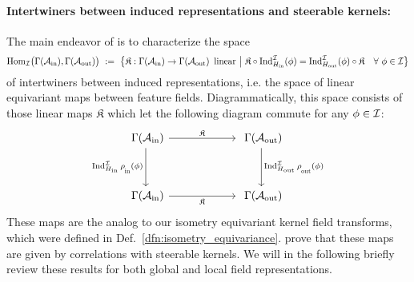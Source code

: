 \paragraph{Intertwiners between induced representations and steerable kernels:}
The main endeavor of \citet{Cohen2018-intertwiners}\cite{Cohen2019-generaltheory} is to characterize the space
\begin{align}
    \Hom_{\I}\! \big( \Gamma(\Ain), \Gamma(\Aout) \big)
    \ :=\ \big\{ \mathfrak{K}: \Gamma(\Ain) \to \Gamma(\Aout)\,\ \textup{linear} \ \big|\ 
        \mathfrak{K}\circ \Ind_{\Hin}^{\I}(\phi) = \Ind_{\Hout}^{\I}(\phi) \circ\mathfrak{K}\ \ \ \forall\ \phi\in\I \big\}
\end{align}
of intertwiners between induced representations, i.e. the space of linear equivariant maps between feature fields.
Diagrammatically, this space consists of those linear maps $\mathfrak{K}$ which let the following diagram commute for any $\phi\in\mathcal{I}$:
\begin{equation}
\begin{tikzcd}[column sep=60pt, row sep=35, font=\normalsize]
    \Gamma(\Ain)
        \arrow[r, "\mathfrak{K}"]
        \arrow[d, "\Ind_{\Hin}^{\I} \rhoin(\phi)"']
    &
    \Gamma(\Aout)
        \arrow[d, "\Ind_{\Hout}^{\I} \rhoout(\phi)"]
    \\
    \Gamma(\Ain)
        \arrow[r, "\mathfrak{K}"']
    &
    \Gamma(\Aout)
\end{tikzcd}
\end{equation}
These maps are the analog to our isometry equivariant kernel field transforms, which were defined in Def.~\ref{dfn:isometry_equivariance}.
\citet{Cohen2018-intertwiners}\cite{Cohen2019-generaltheory} prove that these maps are given by correlations with steerable kernels.
We will in the following briefly review these results for both global and local field representations.


